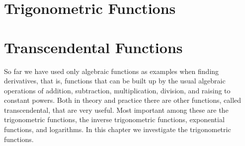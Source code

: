 \iflatetranscendentals
\chapter{Trigonometric Functions}
\elselatetranscendentals
\chapter{Transcendental Functions}
\filatetranscendentals

So far we have used only algebraic functions as examples when finding
derivatives, that is, functions that can be built up by the usual
algebraic operations of addition, subtraction, multiplication,
division, and raising to constant powers. Both in theory and practice
there are other functions, called transcendental, that are very useful. Most important among these are the
trigonometric functions, the inverse trigonometric functions,
exponential functions, and logarithms. 
\iflatetranscendentals
In this chapter we investigate
the trigonometric functions.
\filatetranscendentals






\iflatetranscendentals
\elselatetranscendentals


\filatetranscendentals

\iflatetranscendentals
\elselatetranscendentals

\filatetranscendentals

\iflatetranscendentals
\elselatetranscendentals

\filatetranscendentals
